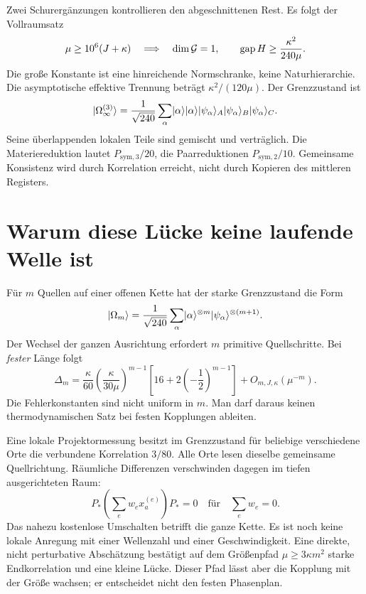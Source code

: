 Zwei Schurergänzungen kontrollieren den abgeschnittenen Rest. Es folgt der Vollraumsatz
\[
 \mu\ge10^6(J+\kappa)\quad\Longrightarrow\quad
 \dim\mathcal G=1,\qquad\operatorname{gap} H\ge\frac{\kappa^2}{240\mu}.
\]
Die große Konstante ist eine hinreichende Normschranke, keine Naturhierarchie. Die asymptotische effektive Trennung beträgt $\kappa^2/(120\mu)$. Der Grenzzustand ist
\[
 \lvert \Omega_\infty^{(3)}\rangle=\frac1{\sqrt{240}}\sum_\alpha
 \lvert \alpha\rangle\lvert \alpha\rangle
 \lvert \psi_\alpha\rangle_A\lvert \psi_\alpha\rangle_B\lvert \psi_\alpha\rangle_C.
\]
Seine überlappenden lokalen Teile sind gemischt und verträglich. Die Materiereduktion lautet $P_{\mathrm{sym},3}/20$, die Paarreduktionen $P_{\mathrm{sym},2}/10$. Gemeinsame Konsistenz wird durch Korrelation erreicht, nicht durch Kopieren des mittleren Registers. 

\section{Warum diese Lücke keine laufende Welle ist}
Für $m$ Quellen auf einer offenen Kette hat der starke Grenzzustand die Form
\[
 \lvert \Omega_m\rangle=\frac1{\sqrt{240}}\sum_\alpha
 \lvert \alpha\rangle^{\otimes m}\lvert \psi_\alpha\rangle^{\otimes(m+1)}.
\]
Der Wechsel der ganzen Ausrichtung erfordert $m$ primitive Quellschritte. Bei \emph{fester} Länge folgt
\[
 \Delta_m=\frac{\kappa}{60}
 \left(\frac{\kappa}{30\mu}\right)^{m-1}
 \left[16+2\left(-\frac12\right)^{m-1}\right]
 +O_{m,J,\kappa}(\mu^{-m}).
\]
Die Fehlerkonstanten sind nicht uniform in $m$. Man darf daraus keinen thermodynamischen Satz bei festen Kopplungen ableiten. 

Eine lokale Projektormessung besitzt im Grenzzustand für beliebige verschiedene Orte die verbundene Korrelation $3/80$. Alle Orte lesen dieselbe gemeinsame Quellrichtung. Räumliche Differenzen verschwinden dagegen im tiefen ausgerichteten Raum:
\[
 P_*\left(\sum_e w_e x_a^{(e)}\right)P_*=0
 \quad\text{für}\quad\sum_e w_e=0.
\]
Das nahezu kostenlose Umschalten betrifft die ganze Kette. Es ist noch keine lokale Anregung mit einer Wellenzahl und einer Geschwindigkeit. Eine direkte, nicht perturbative Abschätzung bestätigt auf dem Größenpfad $\mu\ge3\kappa m^2$ starke Endkorrelation und eine kleine Lücke. Dieser Pfad lässt aber die Kopplung mit der Größe wachsen; er entscheidet nicht den festen Phasenplan. 

